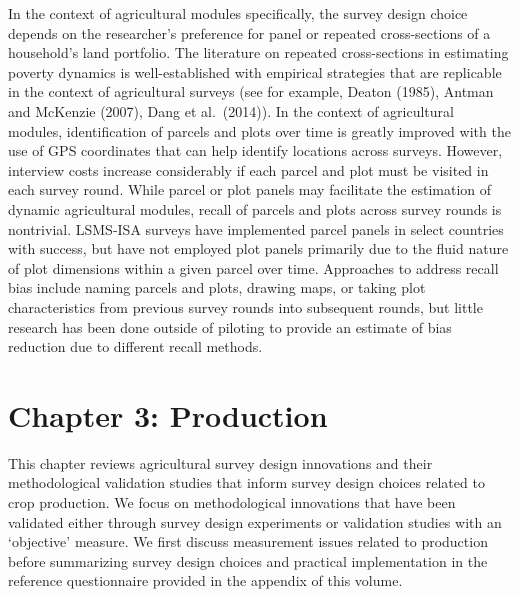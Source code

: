 \documentclass[
]{book}
\begin{document}
In the context of agricultural modules specifically, the survey design choice depends on the researcher's preference for panel or repeated cross-sections of a household's land portfolio. The literature on repeated cross-sections in estimating poverty dynamics is well-established with empirical strategies that are replicable in the context of agricultural surveys (see for example, Deaton (1985), Antman and McKenzie (2007), Dang et al.~(2014)). In the context of agricultural modules, identification of parcels and plots over time is greatly improved with the use of GPS coordinates that can help identify locations across surveys. However, interview costs increase considerably if each parcel and plot must be visited in each survey round. While parcel or plot panels may facilitate the estimation of dynamic agricultural modules, recall of parcels and plots across survey rounds is nontrivial. LSMS-ISA surveys have implemented parcel panels in select countries with success, but have not employed plot panels primarily due to the fluid nature of plot dimensions within a given parcel over time. Approaches to address recall bias include naming parcels and plots, drawing maps, or taking plot characteristics from previous survey rounds into subsequent rounds, but little research has been done outside of piloting to provide an estimate of bias reduction due to different recall methods.

\hypertarget{chapter-3-production}{%
\chapter{Chapter 3: Production}\label{chapter-3-production}}

This chapter reviews agricultural survey design innovations and their methodological validation studies that inform survey design choices related to crop production. We focus on methodological innovations that have been validated either through survey design experiments or validation studies with an `objective' measure. We first discuss measurement issues related to production before summarizing survey design choices and practical implementation in the reference questionnaire provided in the appendix of this volume.
\end{document}
